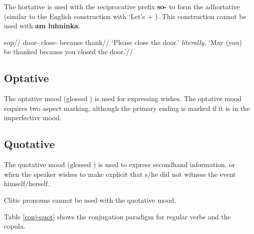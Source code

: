 \par The hortative is used with the reciprocative prefix \textbf{so-} to form the adhortative (similar to the English construction with `Let's + ). This construction cannot be used with \textbf{am luhninka}.

\pex
\begingl
\gla sop//
\glb door- close-  because thank//
\glft  `Please close the door.' \textit{literally,} `May (you) be thanked because you closed the door.'//
\endgl
\xe

\subsection{Optative}
The optative mood (glossed ) is used for expressing wishes. The optative mood requires two aspect marking, although the primary ending is marked if it is in the imperfective mood.



\subsection{Quotative }	
\par The quotative mood (glossed ) is used to express secondhand information, or when the speaker wishes to make explicit that s/he did not witness the event himself/herself.
\par Clitic pronouns cannot be used with the quotative mood.
\par Table \ref{conj-quot} shows the conjugation paradigm for regular verbs and the copula.


